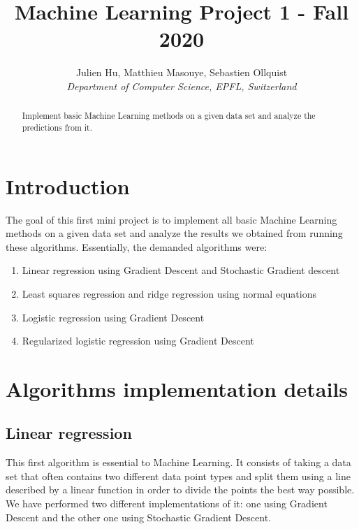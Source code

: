 \documentclass[10pt,conference,compsocconf]{IEEEtran}
\begin{document}
\title{Machine Learning Project 1 - Fall 2020}

\author{
  Julien Hu, Matthieu Masouye, Sebastien Ollquist\\
  \textit{Department of Computer Science, EPFL, Switzerland}
}

\maketitle

\begin{abstract}
  Implement basic Machine Learning methods on a given data set and analyze the predictions from it.
\end{abstract}

\section{Introduction}
The goal of this first mini project is to implement all basic Machine Learning methods on a given data set and analyze the results we obtained from running these algorithms. Essentially, the demanded algorithms were:
\begin{enumerate}
  \item Linear regression using Gradient Descent and Stochastic Gradient descent
  \item Least squares regression and ridge regression using normal equations
  \item Logistic regression using Gradient Descent
  \item Regularized logistic regression using Gradient Descent
\end{enumerate}

\section{Algorithms implementation details}
\subsection{Linear regression}
This first algorithm is essential to Machine Learning. It consists of taking a data set that often contains two different data point types and split them using a line described by a linear function in order to divide the points the best way possible. We have performed two different implementations of it: one using Gradient Descent and the other one using Stochastic Gradient Descent.
\end{document}
